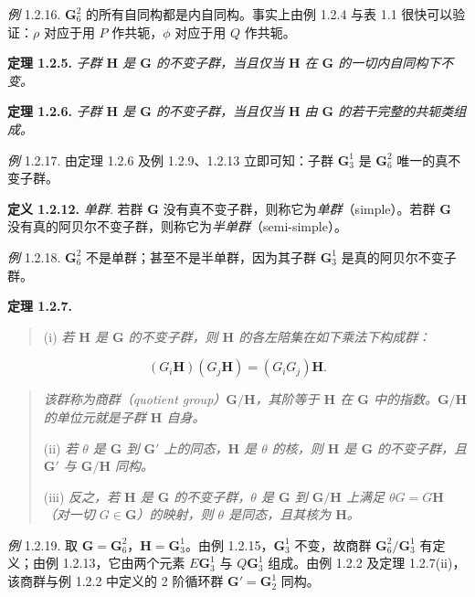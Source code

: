 \textit{例} 1.2.16. $\mathbf{G}_6^2$ 的所有自同构都是内自同构。事实上由例 1.2.4 与表 1.1 很快可以验证：$\rho$ 对应于用 $P$ 作共轭，$\phi$ 对应于用 $Q$ 作共轭。

\textbf{定理 1.2.5.} \textit{子群 $\mathbf{H}$ 是 $\mathbf{G}$ 的不变子群，当且仅当 $\mathbf{H}$ 在 $\mathbf{G}$ 的一切内自同构下不变。}

\textbf{定理 1.2.6.} \textit{子群 $\mathbf{H}$ 是 $\mathbf{G}$ 的不变子群，当且仅当 $\mathbf{H}$ 由 $\mathbf{G}$ 的若干完整的共轭类组成。}

\textit{例} 1.2.17. 由定理 1.2.6 及例 1.2.9、1.2.13 立即可知：子群 $\mathbf{G}_3^1$ 是 $\mathbf{G}_6^2$ 唯一的真不变子群。

\textbf{定义 1.2.12.} \textit{单群.} 若群 $\mathbf{G}$ 没有真不变子群，则称它为\textit{单群}（simple）。若群 $\mathbf{G}$ 没有真的阿贝尔不变子群，则称它为\textit{半单群}（semi-simple）。

\textit{例} 1.2.18. $\mathbf{G}_6^2$ 不是单群；甚至不是半单群，因为其子群 $\mathbf{G}_3^1$ 是真的阿贝尔不变子群。

\textbf{定理 1.2.7.}

\begin{quote}
(i) \textit{若 $\mathbf{H}$ 是 $\mathbf{G}$ 的不变子群，则 $\mathbf{H}$ 的各左陪集在如下乘法下构成群：}

\end{quote}
\begin{equation*}
(G_{i}\mathbf{H})(G_{j}\mathbf{H}) = (G_{i}G_{j})\mathbf{H}. \tag{1.2.4}
\end{equation*}

\begin{quote}

\textit{该群称为商群（quotient group）$\mathbf{G}/\mathbf{H}$，其阶等于 $\mathbf{H}$ 在 $\mathbf{G}$ 中的指数。$\mathbf{G}/\mathbf{H}$ 的单位元就是子群 $\mathbf{H}$ 自身。}

(ii) \textit{若 $\theta$ 是 $\mathbf{G}$ 到 $\mathbf{G}'$ 上的同态，$\mathbf{H}$ 是 $\theta$ 的核，则 $\mathbf{H}$ 是 $\mathbf{G}$ 的不变子群，且 $\mathbf{G}'$ 与 $\mathbf{G}/\mathbf{H}$ 同构。}

(iii) \textit{反之，若 $\mathbf{H}$ 是 $\mathbf{G}$ 的不变子群，$\theta$ 是 $\mathbf{G}$ 到 $\mathbf{G}/\mathbf{H}$ 上满足 $\theta G = G\mathbf{H}$（对一切 $G \in \mathbf{G}$）的映射，则 $\theta$ 是同态，且其核为 $\mathbf{H}$。}
\end{quote}

\textit{例} 1.2.19. 取 $\mathbf{G} = \mathbf{G}_6^2$，$\mathbf{H} = \mathbf{G}_3^1$。由例 1.2.15，$\mathbf{G}_3^1$ 不变，故商群 $\mathbf{G}_6^2/\mathbf{G}_3^1$ 有定义；由例 1.2.13，它由两个元素 $E\mathbf{G}_3^1$ 与 $Q\mathbf{G}_3^1$ 组成。由例 1.2.2 及定理 1.2.7(ii)，该商群与例 1.2.2 中定义的 2 阶循环群 $\mathbf{G}' = \mathbf{G}_2^1$ 同构。

